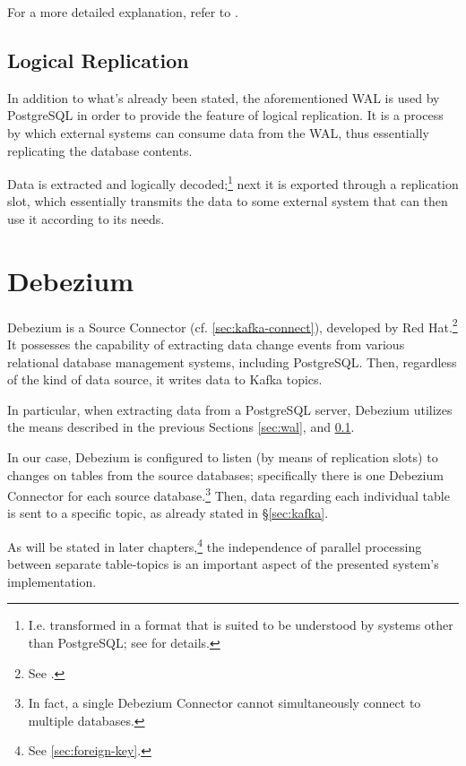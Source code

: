 For a more detailed explanation, refer to \cite[Chapter 29]{pg-docs}.


\subsection{Logical Replication}
\label{sec:pg-replication}

In addition to what's already been stated, the aforementioned WAL is used by PostgreSQL in order to provide the feature of logical replication.
It is a process by which external systems can consume data from the WAL, thus essentially replicating the database contents.

Data is extracted and logically decoded;\footnote{
	I.e. transformed in a format that is suited to be understood by systems other than PostgreSQL; see \cite[Chapter 48]{pg-docs} for details.
} next it is exported through a replication slot, which essentially transmits the data to some external system that can then use it according to its needs.


\section{Debezium}
\label{sec:debezium}

Debezium is a Source Connector (cf. \ref{sec:kafka-connect}), developed by Red Hat.\footnote{%
	See \cite{debezium-docs}.
}
It possesses the capability of extracting data change events from various relational database management systems, including PostgreSQL.
Then, regardless of the kind of data source, it writes data to Kafka topics.

In particular, when extracting data from a PostgreSQL server, Debezium utilizes the means described in the previous Sections \ref{sec:wal}, and \ref{sec:pg-replication}.

In our case, Debezium is configured to listen (by means of replication slots) to changes on tables from the source databases; specifically there is one Debezium Connector for each source database.\footnote{%
	In fact, a single Debezium Connector cannot simultaneously connect to multiple databases.
}
Then, data regarding each individual table is sent to a specific topic, as already stated in \S \ref{sec:kafka}.

As will be stated in later chapters,\footnote{%
	See \ref{sec:foreign-key}.
} the independence of parallel processing between separate table-topics is an important aspect of the presented system's implementation.


